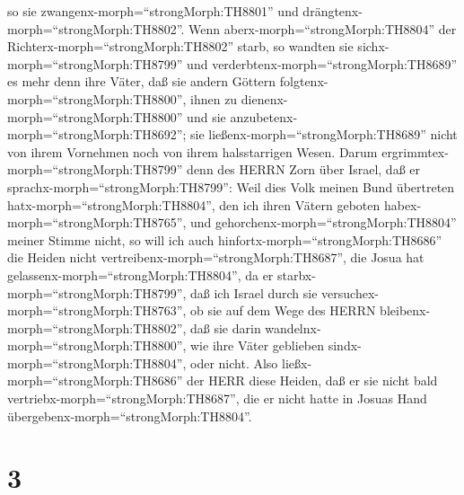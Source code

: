 so sie zwangenx-morph=``strongMorph:TH8801'' und
drängtenx-morph=``strongMorph:TH8802''.  Wenn
aberx-morph=``strongMorph:TH8804'' der
Richterx-morph=``strongMorph:TH8802'' starb, so wandten sie
sichx-morph=``strongMorph:TH8799'' und
verderbtenx-morph=``strongMorph:TH8689'' es mehr denn ihre Väter, daß
sie andern Göttern folgtenx-morph=``strongMorph:TH8800'', ihnen zu
dienenx-morph=``strongMorph:TH8800'' und sie
anzubetenx-morph=``strongMorph:TH8692''; sie
ließenx-morph=``strongMorph:TH8689'' nicht von ihrem Vornehmen noch von
ihrem halsstarrigen Wesen.  Darum
ergrimmtex-morph=``strongMorph:TH8799'' denn des HERRN Zorn über Israel,
daß er sprachx-morph=``strongMorph:TH8799'': Weil dies Volk meinen Bund
übertreten hatx-morph=``strongMorph:TH8804'', den ich ihren Vätern
geboten habex-morph=``strongMorph:TH8765'', und
gehorchenx-morph=``strongMorph:TH8804'' meiner Stimme nicht,
 so will ich auch hinfortx-morph=``strongMorph:TH8686'' die
Heiden nicht vertreibenx-morph=``strongMorph:TH8687'', die Josua hat
gelassenx-morph=``strongMorph:TH8804'', da er
starbx-morph=``strongMorph:TH8799'',  daß ich Israel durch
sie versuchex-morph=``strongMorph:TH8763'', ob sie auf dem Wege des
HERRN bleibenx-morph=``strongMorph:TH8802'', daß sie darin
wandelnx-morph=``strongMorph:TH8800'', wie ihre Väter geblieben
sindx-morph=``strongMorph:TH8804'', oder nicht.  Also
ließx-morph=``strongMorph:TH8686'' der HERR diese Heiden, daß er sie
nicht bald vertriebx-morph=``strongMorph:TH8687'', die er nicht hatte in
Josuas Hand übergebenx-morph=``strongMorph:TH8804''.

\hypertarget{section-2}{%
\section{3}\label{section-2}}

